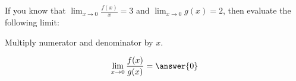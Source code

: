 \documentclass{ximera}
\author{Steven Gubkin}
\begin{document}
\begin{exercise}

	If you know that $\lim_{x \to 0} \frac{f(x)}{x} = 3$ and $\lim_{x \to 0} g(x) = 2$, then evaluate the following limit:
	
	\begin{hint}
		Multiply numerator and denominator by $x$.
	\end{hint}
	
	\[
		\lim_{x \to 0} \frac{f(x)}{g(x)} = \answer{0}
	\]
	
\end{exercise}
\end{document}

